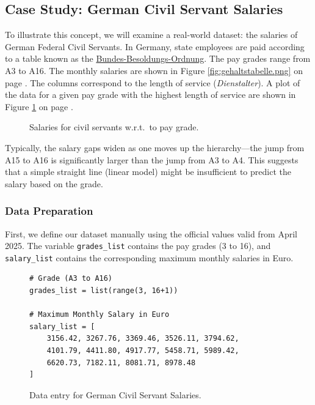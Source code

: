 \subsection{Case Study: German Civil Servant Salaries}
To illustrate this concept, we will examine a real-world dataset: the salaries of German Federal Civil
Servants. In Germany, state employees are paid according to a table known as the
\href{https://oeffentlicher-dienst.info/c/t/rechner/beamte/bund?id=beamte-bund-2025&matrix=1}{Bundes-Besoldungs-Ordnung}.
The pay grades range from A3 to A16.  The monthly salaries are shown in Figure \ref{fig:gehaltstabelle.png} on
page \pageref{fig:gehaltstabelle.png}.  The columns correspond to the length of service (\emph{Dienstalter}).
A plot of the data for a given pay grade with the highest length of service are shown in Figure \ref{fig:gehaltsplot.png}
on page \pageref{fig:gehaltsplot.png}.

\begin{figure}[!ht]
  \begin{center}
  \end{center}

\caption{Salaries for civil servants w.r.t.~to pay grade.}
\label{fig:gehaltsplot.png}
\end{figure}

Typically, the salary gaps widen as one moves up the hierarchy—the jump
from A15 to A16 is significantly larger than the jump from A3 to A4. This suggests that a simple straight line
(linear model) might be insufficient to predict the salary based on the grade.
\pagebreak

\subsubsection{Data Preparation}
First, we define our dataset manually using the official values valid from April 2025. The variable \texttt{grades\_list} contains the pay grades (3 to 16), and \texttt{salary\_list} contains the corresponding maximum monthly salaries in Euro.

\begin{figure}[!ht]
\centering
\begin{verbatim}
# Grade (A3 to A16)
grades_list = list(range(3, 16+1))

# Maximum Monthly Salary in Euro 
salary_list = [
    3156.42, 3267.76, 3369.46, 3526.11, 3794.62, 
    4101.79, 4411.80, 4917.77, 5458.71, 5989.42, 
    6620.73, 7182.11, 8081.71, 8978.48
]
\end{verbatim}
\caption{Data entry for German Civil Servant Salaries.}
\label{fig:salary_data}
\end{figure}

